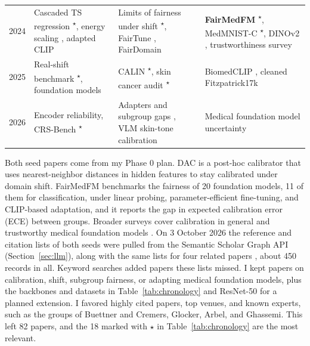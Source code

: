 \documentclass[sigconf,nonacm]{acmart}
\newcommand{\core}{\textsuperscript{$\star$}}
\begin{document}
\begin{table}[t]
\begin{tabularx}{\textwidth}{@{}l>{\raggedright\arraybackslash}X>{\raggedright\arraybackslash}X>{\raggedright\arraybackslash}X@{}}
    2024 & Cascaded TS regression \cite{wang2024cascaded}\core, energy scaling \cite{kim2024energy}, adapted CLIP \cite{tu2024empirical,oh2024calibrated,murugesan2024robust} & Limits of fairness under shift \cite{yang2024limits}\core, FairTune \cite{dutt2024fairtune}, FairDomain \cite{tian2024fairdomain} & \textbf{FairMedFM} \cite{jin2024fairmedfm}\core, MedMNIST-C \cite{disalvo2024medmnistc}\core, DINOv2 \cite{oquab2024dinov2}, trustworthiness survey \cite{shi2024survey} \\
    2025 & Real-shift benchmark \cite{roschewitz2025where}\core, foundation models \cite{hekler2025beyond} & CALIN \cite{shen2025calin}\core, skin cancer audit \cite{dominique2025calibration}\core & BiomedCLIP \cite{zhang2025biomedclip}, cleaned Fitzpatrick17k \cite{abhishek2025quality} \\
    2026 & Encoder reliability, CRS-Bench \cite{lin2026crsbench}\core & Adapters and subgroup gaps \cite{gupta2026subgroup}, VLM skin-tone calibration \cite{xu2026demographic} & Medical foundation model uncertainty \cite{huang2026uncertainty} \\
    \bottomrule
  \end{tabularx}
\end{table}

Both seed papers come from my Phase 0 plan. DAC \cite{tomani2023dac} is a post-hoc calibrator that uses nearest-neighbor distances in hidden features to stay calibrated under domain shift. FairMedFM \cite{jin2024fairmedfm} benchmarks the fairness of 20 foundation models, 11 of them for classification, under linear probing, parameter-efficient fine-tuning, and CLIP-based adaptation, and it reports the gap in expected calibration error (ECE) between groups. Broader surveys cover calibration in general \cite{wang2023survey} and trustworthy medical foundation models \cite{shi2024survey}. On 3 October 2026 the reference and citation lists of both seeds were pulled from the Semantic Scholar Graph API (Section~\ref{sec:llm}), along with the same lists for four related papers \cite{tomani2021posthoc,roschewitz2025where,disalvo2024medmnistc,salvador2022faircal}, about 450 records in all. Keyword searches added papers these lists missed. I kept papers on calibration, shift, subgroup fairness, or adapting medical foundation models, plus the backbones and datasets in Table~\ref{tab:chronology} and ResNet-50 \cite{he2016resnet} for a planned extension. I favored highly cited papers, top venues, and known experts, such as the groups of Buettner and Cremers, Glocker, Arbel, and Ghassemi. This left 82 papers, and the 18 marked with $\star$ in Table~\ref{tab:chronology} are the most relevant.
\end{document}
